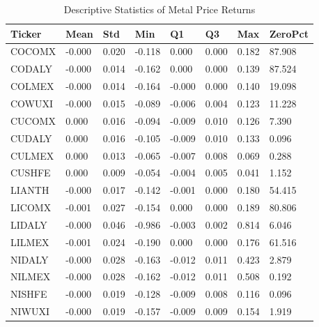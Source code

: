\begin{table}

\caption{\label{tab:metals_returns_stats}Descriptive Statistics of Metal Price Returns}
\centering
\begin{tabular}[t]{llllllll}
\toprule
Ticker & Mean & Std & Min & Q1 & Q3 & Max & ZeroPct\\
\midrule
COCOMX & -0.000 & 0.020 & -0.118 & 0.000 & 0.000 & 0.182 & 87.908\\
CODALY & -0.000 & 0.014 & -0.162 & 0.000 & 0.000 & 0.139 & 87.524\\
COLMEX & -0.000 & 0.014 & -0.164 & -0.000 & 0.000 & 0.140 & 19.098\\
COWUXI & -0.000 & 0.015 & -0.089 & -0.006 & 0.004 & 0.123 & 11.228\\
CUCOMX & 0.000 & 0.016 & -0.094 & -0.009 & 0.010 & 0.126 & 7.390\\
CUDALY & 0.000 & 0.016 & -0.105 & -0.009 & 0.010 & 0.133 & 0.096\\
CULMEX & 0.000 & 0.013 & -0.065 & -0.007 & 0.008 & 0.069 & 0.288\\
CUSHFE & 0.000 & 0.009 & -0.054 & -0.004 & 0.005 & 0.041 & 1.152\\
LIANTH & -0.000 & 0.017 & -0.142 & -0.001 & 0.000 & 0.180 & 54.415\\
LICOMX & -0.001 & 0.027 & -0.154 & 0.000 & 0.000 & 0.189 & 80.806\\
LIDALY & -0.000 & 0.046 & -0.986 & -0.003 & 0.002 & 0.814 & 6.046\\
LILMEX & -0.001 & 0.024 & -0.190 & 0.000 & 0.000 & 0.176 & 61.516\\
NIDALY & -0.000 & 0.028 & -0.163 & -0.012 & 0.011 & 0.423 & 2.879\\
NILMEX & -0.000 & 0.028 & -0.162 & -0.012 & 0.011 & 0.508 & 0.192\\
NISHFE & -0.000 & 0.019 & -0.128 & -0.009 & 0.008 & 0.116 & 0.096\\
NIWUXI & -0.000 & 0.019 & -0.157 & -0.009 & 0.009 & 0.154 & 1.919\\
\bottomrule
\end{tabular}
\end{table}
